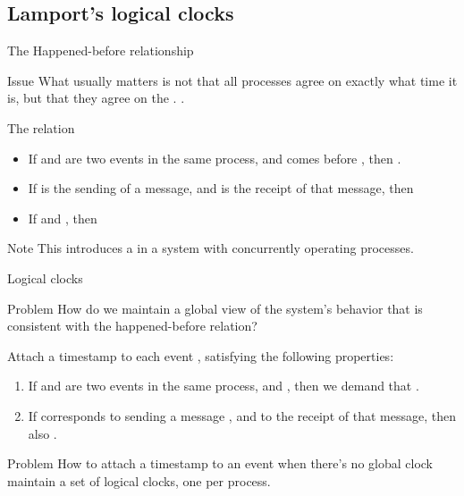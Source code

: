 \subsection{Lamport's logical clocks}
\begin{slide}{The Happened-before relationship}
  \begin{alertblock}{Issue}
    What usually matters is not that all processes agree on exactly what time it is, but that they agree on
    the . .
  \end{alertblock}
  \begin{block}{The  relation}
    \begin{itemize}\tightlist
    \item If  and  are two events in the same process, and  comes before
      , then .
    \item If  is the sending of a message, and  is the receipt of that message, then
    \item If  and , then 
    \end{itemize}
  \end{block}
  \begin{alertblock}{Note}
    This introduces a  in a system with concurrently operating processes.
  \end{alertblock}
\end{slide}
\begin{slide}{Logical clocks}
  \begin{alertblock}{Problem}
    How do we maintain a global view of the system's behavior that is consistent with the happened-before
    relation?
  \end{alertblock}
  \begin{block}{Attach a time\-stamp  to each event , satisfying the following properties:}
    \begin{enumerate}\tightlist
    \item[\blue{P1}] If  and  are two events in the same process, and , then we demand that .
    \item[\blue{P2}] If  corresponds to sending a message , and  to the
      receipt of that message, then also .
    \end{enumerate}
  \end{block}
  \begin{alertblock}{Problem}
    How to attach a time\-stamp to an event when there's no global clock \mathexpr{\Rightarrow} maintain a
     set of logical clocks, one per process.
  \end{alertblock}
\end{slide}
